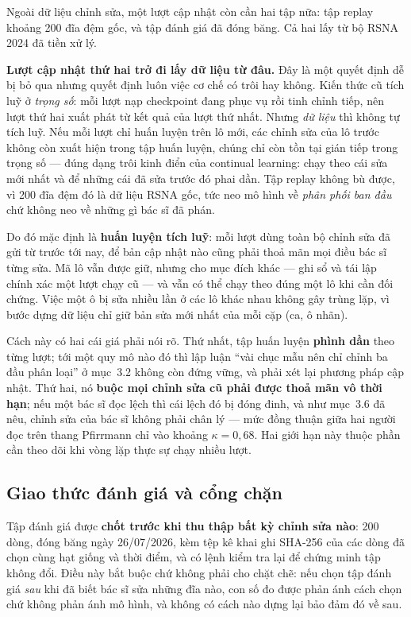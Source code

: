 \documentclass[11pt,a4paper]{article}
\begin{document}
Ngoài dữ liệu chỉnh sửa, một lượt cập nhật còn cần hai tập nữa: tập replay khoảng 200 đĩa đệm gốc,
và tập đánh giá đã đóng băng. Cả hai lấy từ bộ RSNA 2024 đã tiền xử lý.

\textbf{Lượt cập nhật thứ hai trở đi lấy dữ liệu từ đâu.} Đây là một quyết định dễ bị bỏ qua nhưng
quyết định luôn việc cơ chế có trôi hay không. Kiến thức cũ tích luỹ ở \textit{trọng số}: mỗi lượt
nạp checkpoint đang phục vụ rồi tinh chỉnh tiếp, nên lượt thứ hai xuất phát từ kết quả của lượt
thứ nhất. Nhưng \textit{dữ liệu} thì không tự tích luỹ. Nếu mỗi lượt chỉ huấn luyện trên lô mới,
các chỉnh sửa của lô trước không còn xuất hiện trong tập huấn luyện, chúng chỉ còn tồn tại gián
tiếp trong trọng số --- đúng dạng trôi kinh điển của continual learning: chạy theo cái sửa mới
nhất và để những cái đã sửa trước đó phai dần. Tập replay không bù được, vì 200 đĩa đệm đó là dữ
liệu RSNA gốc, tức neo mô hình về \textit{phân phối ban đầu} chứ không neo về những gì bác sĩ đã
phán.

Do đó mặc định là \textbf{huấn luyện tích luỹ}: mỗi lượt dùng toàn bộ chỉnh sửa đã gửi từ trước
tới nay, để bản cập nhật nào cũng phải thoả mãn mọi điều bác sĩ từng sửa. Mã lô vẫn được giữ, nhưng
cho mục đích khác --- ghi sổ và tái lập chính xác một lượt chạy cũ --- và vẫn có thể chạy theo
đúng một lô khi cần đối chứng. Việc một ô bị sửa nhiều lần ở các lô khác nhau không gây trùng lặp,
vì bước dựng dữ liệu chỉ giữ bản sửa mới nhất của mỗi cặp (ca, ô nhãn).

Cách này có hai cái giá phải nói rõ. Thứ nhất, tập huấn luyện \textbf{phình dần} theo từng lượt;
tới một quy mô nào đó thì lập luận ``vài chục mẫu nên chỉ chỉnh ba đầu phân loại'' ở mục~3.2 không
còn đứng vững, và phải xét lại phương pháp cập nhật. Thứ hai, nó \textbf{buộc mọi chỉnh sửa cũ
phải được thoả mãn vô thời hạn}; nếu một bác sĩ đọc lệch thì cái lệch đó bị đóng đinh, và như
mục~3.6 đã nêu, chỉnh sửa của bác sĩ không phải chân lý --- mức đồng thuận giữa hai người đọc trên
thang Pfirrmann chỉ vào khoảng $\kappa = 0{,}68$. Hai giới hạn này thuộc phần cần theo dõi khi
vòng lặp thực sự chạy nhiều lượt.

\subsection{Giao thức đánh giá và cổng chặn}

Tập đánh giá được \textbf{chốt trước khi thu thập bất kỳ chỉnh sửa nào}: 200 dòng, đóng băng ngày
26/07/2026, kèm tệp kê khai ghi SHA-256 của các dòng đã chọn cùng hạt giống và thời điểm, và có
lệnh kiểm tra lại để chứng minh tập không đổi. Điều này bắt buộc chứ không phải cho chặt chẽ: nếu
chọn tập đánh giá \textit{sau} khi đã biết bác sĩ sửa những đĩa nào, con số đo được phản ánh cách
chọn chứ không phản ánh mô hình, và không có cách nào dựng lại bảo đảm đó về sau.
\end{document}
